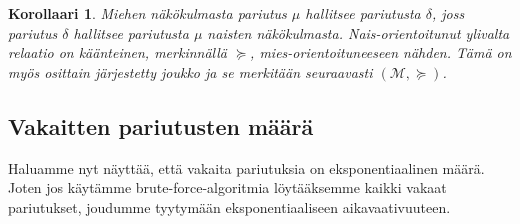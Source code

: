 \documentclass[finnish]{tktltiki2}
\newtheorem{kor}[lau]{Korollaari}
\theoremstyle{definition}
\theoremstyle{remark}
\begin{document}
\begin{kor}\cite[s. 19]{gusfield1989stable}
Miehen näkökulmasta pariutus $\mu$ hallitsee pariutusta $\delta$, joss pariutus $\delta$ hallitsee pariutusta $\mu$ naisten näkökulmasta. \emph{Nais-orientoitunut} ylivalta relaatio on käänteinen, merkinnällä $\succeq$, mies-orientoituneeseen nähden. Tämä on myös osittain järjestetty joukko ja se merkitään seuraavasti $(\mathcal{M}, \succeq)$. 
\end{kor}

\subsection{Vakaitten pariutusten määrä}
Haluamme nyt näyttää, että vakaita pariutuksia on eksponentiaalinen määrä. Joten jos käytämme brute-force-algoritmia löytääksemme kaikki vakaat pariutukset, joudumme tyytymään eksponentiaaliseen aikavaativuuteen.
\end{document}
